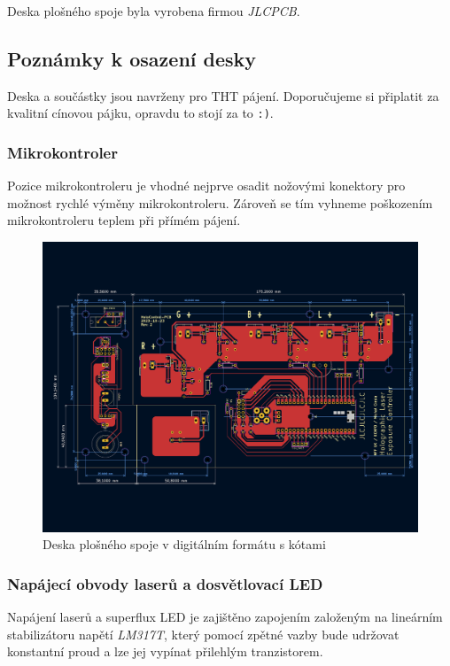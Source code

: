 \documentclass[twoside,project,skipblank]{../MFFPrace}
\begin{document}
\medskip

Deska plošného spoje byla vyrobena firmou \textit{JLCPCB}.
\subsection{Poznámky k osazení desky}
Deska a součástky jsou navrženy pro THT pájení. Doporučujeme si připlatit za kvalitní cínovou pájku, opravdu to stojí za to \texttt{:)}.

\subsubsection{Mikrokontroler}
Pozice mikrokontroleru je vhodné nejprve osadit nožovými konektory pro možnost rychlé výměny mikrokontroleru. Zároveň se tím vyhneme poškozením mikrokontroleru teplem při přímém pájení.


\begin{landscape}
    \centering
    \begin{figure}
        \includegraphics[width=19.3cm]{../../HoloControl-PCB/holo-controller-pcb.pdf}
        \caption{Deska plošného spoje v digitálním formátu s kótami}
        \label{fig:pcb}
    \end{figure}
\end{landscape}

\subsubsection{Napájecí obvody laserů a dosvětlovací LED}
Napájení laserů a superflux LED je zajištěno zapojením založeným na lineárním stabilizátoru napětí \textit{LM317T}, který pomocí zpětné vazby bude udržovat konstantní proud a lze jej vypínat přilehlým tranzistorem.
\end{document}
